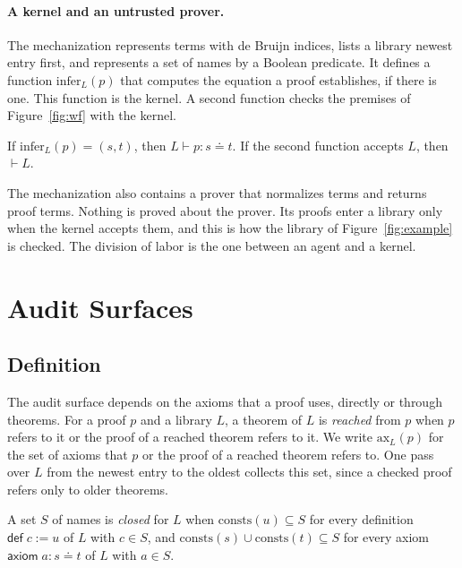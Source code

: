 \documentclass[acmsmall,nonacm,screen]{acmart}
\newcommand{\eqd}{\doteq}
\newcommand{\kw}[1]{\mathsf{#1}}
\newcommand{\chk}[4]{#1 \vdash #2 : #3 \eqd #4}
\newcommand{\wf}[1]{\vdash #1}
\newcommand{\consts}{\mathrm{consts}}
\newcommand{\axs}{\mathrm{ax}}
\begin{document}
\paragraph{A kernel and an untrusted prover.}
The mechanization represents terms with de Bruijn indices, lists a library newest entry first,
and represents a set of names by a Boolean predicate. It defines a function
$\mathrm{infer}_L(p)$ that computes the equation a proof establishes, if there is one. This
function is the kernel. A second function checks the premises of Figure~\ref{fig:wf} with the
kernel.

\begin{proposition}
\label{prop:kernel}
If $\mathrm{infer}_L(p) = (s, t)$, then $\chk{L}{p}{s}{t}$. If the second function accepts $L$,
then $\wf{L}$.
\end{proposition}

The mechanization also contains a prover that normalizes terms and returns proof terms. Nothing is
proved about the prover. Its proofs enter a library only when the kernel accepts them, and this
is how the library of Figure~\ref{fig:example} is checked. The division of labor is the one
between an agent and a kernel.

\section{Audit Surfaces}
\label{sec:audit}

\subsection{Definition}

The audit surface depends on the axioms that a proof uses, directly or through theorems. For a
proof $p$ and a library $L$, a theorem of $L$ is \emph{reached} from $p$ when $p$ refers to it
or the proof of a reached theorem refers to it. We write $\axs_L(p)$ for the set of axioms that
$p$ or the proof of a reached theorem refers to. One pass over $L$ from the newest entry to the
oldest collects this set, since a checked proof refers only to older theorems.

\begin{definition}
\label{def:closed}
A set $S$ of names is \emph{closed} for $L$ when $\consts(u) \subseteq S$ for every definition
$\kw{def}\;c := u$ of $L$ with $c \in S$, and $\consts(s) \cup \consts(t) \subseteq S$ for
every axiom $\kw{axiom}\;a : s \eqd t$ of $L$ with $a \in S$.
\end{definition}
\end{document}
